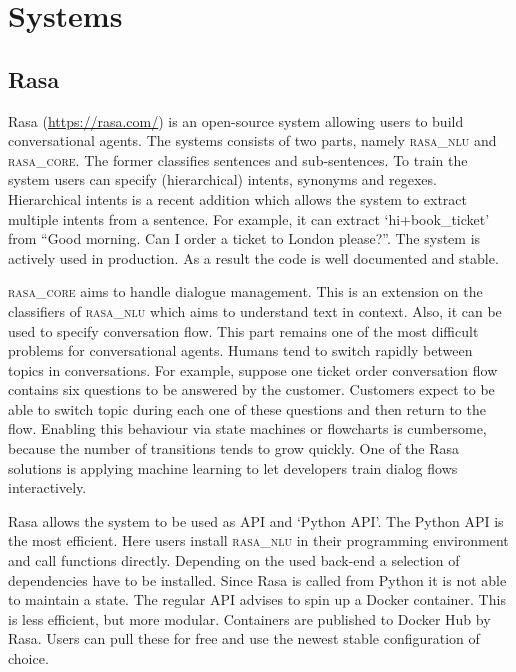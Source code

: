 \section{Systems}
\label{sec:systems}

\subsection{Rasa}
\label{subsec:rasa}
Rasa (\url{https://rasa.com/}) is an open-source system allowing users to build conversational agents.
The systems consists of two parts, namely \textsc{rasa\_nlu} and \textsc{rasa\_core}.
The former classifies sentences and sub-sentences.
To train the system users can specify (hierarchical) intents, synonyms and regexes.
Hierarchical intents is a recent addition which allows the system to extract multiple intents from a sentence.
For example, it can extract `hi+book\_ticket' from
``Good morning.
Can I order a ticket to London please?''.
The system is actively used in production.
As a result the code is well documented and stable.

\textsc{rasa\_core} aims to handle dialogue management.
This is an extension on the classifiers of \textsc{rasa\_nlu} which aims to understand text in context.
Also, it can be used to specify conversation flow.
This part remains one of the most difficult problems for conversational agents.
Humans tend to switch rapidly between topics in conversations.
For example, suppose one ticket order conversation flow contains six questions to be answered by the customer.
Customers expect to be able to switch topic during each one of these questions and then return to the flow.
Enabling this behaviour via state machines or flowcharts is cumbersome, because the number of transitions tends to grow quickly.
One of the Rasa solutions is applying machine learning to let developers train dialog flows interactively.

Rasa allows the system to be used as API and `Python API'.
The Python API is the most efficient.
Here users install \textsc{rasa\_nlu} in their programming environment and call functions directly.
Depending on the used back-end a selection of dependencies have to be installed.
Since Rasa is called from Python it is not able to maintain a state.
The regular API advises to spin up a Docker container.
This is less efficient, but more modular.
Containers are published to Docker Hub by Rasa.
Users can pull these for free and use the newest stable configuration of choice.

